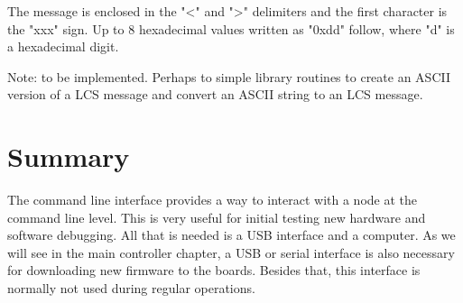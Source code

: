 %

The message is enclosed in the "<" and ">" delimiters and the first character is the "xxx" sign. Up to 8 hexadecimal values written as "0xdd" follow, where "d" is a hexadecimal digit.



Note: to be implemented. Perhaps to simple library routines to create an ASCII version of a LCS message and convert an ASCII string to an LCS message.

\section{Summary}

The command line interface provides a way to interact with a node at the command line level. This is very useful for initial testing new hardware and software debugging. All that is needed is a USB interface and a computer. As we will see in the main controller chapter, a USB or serial interface is also necessary for downloading new firmware to the boards. Besides that, this interface is normally not used during regular operations.
